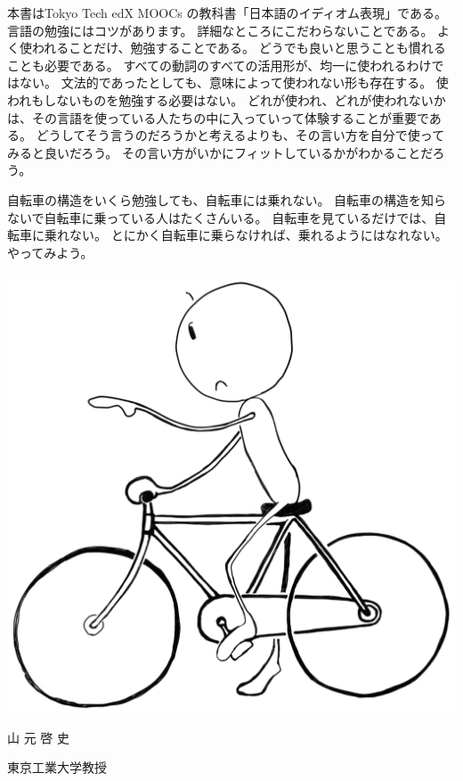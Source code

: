 \documentclass[
uplatex,
b5paper,
10pt,
dvipdfmx
]{jsbook}
\newif\ifEnglish
\begin{document}
\else

本書はTokyo Tech edX MOOCs の教科書「日本語のイディオム表現」である。
言語の勉強にはコツがあります。
詳細なところにこだわらないことである。
よく使われることだけ、勉強することである。
どうでも良いと思うことも慣れることも必要である。
すべての動詞のすべての活用形が、均一に使われるわけではない。
文法的であったとしても、意味によって使われない形も存在する。
使われもしないものを勉強する必要はない。
どれが使われ、どれが使われないかは、その言語を使っている人たちの中に入っていって体験することが重要である。
どうしてそう言うのだろうかと考えるよりも、その言い方を自分で使ってみると良いだろう。
その言い方がいかにフィットしているかがわかることだろう。

自転車の構造をいくら勉強しても、自転車には乗れない。
自転車の構造を知らないで自転車に乗っている人はたくさんいる。
自転車を見ているだけでは、自転車に乗れない。
とにかく自転車に乗らなければ、乗れるようにはなれない。
やってみよう。
\fi

\vspace*{1\baselineskip}
\begin{flushright}
 \includegraphics[width=.2\hsize]{bicycle201801.pdf}

 \ifEnglish
 Hilofumi Yamamoto, Ph.\,D.\\
 Professor of Linguistics\\
 Tokyo Institute of Technology\\
 \else
 {\large 山 元 啓 史}\hspace*{3zw}
 
 {\small 東京工業大学教授\hspace*{2zw}}
\fi
\end{flushright}

\end{document}

